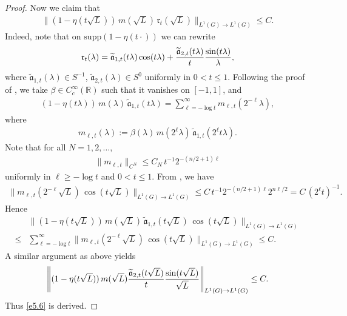 \documentclass[a4paper,12pt]{amsart}
\numberwithin{equation}{section}
\theoremstyle{definition}
\theoremstyle{remark}
\numberwithin{theorem}{section}
\newcommand{\R}{\mathbb{R}}
\newcommand{\supp}{\mathrm{supp}}
\begin{document}
\begin{proof}
Now we claim that
\begin{align}\label{e5.6}
\|(1-\eta(t\sqrt{L}))\,m(\sqrt{L})\,\mathfrak{r}_t(\sqrt{L})\|_{L^1(G)\to L^1(G)}\leq C.
\end{align}
Indeed, note that on $\supp (1-\eta(t\cdot))$ we can rewrite 
\begin{align*}
\mathfrak{r}_t(\lambda)=\widetilde{\mathfrak{a}}_{1,t}(t\lambda)\cos(t\lambda)+{\widetilde{\mathfrak{a}}_{2,t}(t\lambda)\over t}{\sin(t\lambda)\over \lambda},
\end{align*}
where $\widetilde{\mathfrak{a}}_{1,t}(\lambda)\in S^{-1}$, $ \widetilde{\mathfrak{a}}_{2,t}(\lambda)\in S^0$ uniformly in $0<t\leq 1$. Following the proof of \cite[Theorem 8.1]{MuTh}, we take 
$\beta\in C^\infty_c(\R)$ such that it vanishes on $[-1, 1]$, and 
\begin{align*}
(1-\eta(t\lambda))\,m(\lambda)\,\widetilde{\mathfrak{a}}_{1,t}(t\lambda)=\sum_{\ell=-\log t}^\infty m_{\ell,t}(2^{-\ell} \lambda),
\end{align*}
where
\begin{align*}
m_{\ell,t}(\lambda):=\beta(\lambda)\,m(2^\ell\lambda)\,\widetilde{\mathfrak{a}}_{1,t}(2^\ell t\lambda).
\end{align*}
Note that for all $N=1,2,\dots$,
\begin{align*}
\|m_{\ell,t}\|_{C^N} \leq C_N\,t^{-1} 2^{-(n/2+1)\ell}
\end{align*}
uniformly in $\ell\geq-\log t$ and $0<t\leq 1$. From \cite[(8.4)]{MuTh}, we have
\begin{align*}
\|m_{\ell,t}(2^{-\ell}\sqrt{L})\,\cos(t\sqrt{L})\|_{L^1(G)\to L^1(G)}\leq C\,t^{-1} 2^{-(n/2+1)\ell} 2^{n\ell/2}=C\,(2^\ell t)^{-1}.
\end{align*}
Hence
\begin{align*}
{}&\|(1-\eta(t\sqrt{L}))\,m(\sqrt{L})\,\widetilde{\mathfrak{a}}_{1,t}(t\sqrt{L})\,\cos(t\sqrt{L})\|_{L^1(G)\to L^1(G)}\\
\leq{}&\sum_{\ell=-\log t}^\infty \|m_{\ell,t}(2^{-\ell}\sqrt{L})\,\cos(t\sqrt{L})\|_{L^1(G)\to L^1(G)}\leq C.
\end{align*}
A similar argument as above yields 
\begin{align*}
\left\|(1-\eta(t\sqrt{L}))\,m(\sqrt{L}){\widetilde{\mathfrak{a}}_{2,t}(t\sqrt{L})\over t}{\sin(t\sqrt{L})\over \sqrt{L}}\right\|_{L^1(G)\to L^1(G)}\leq C.
\end{align*}
Thus \eqref{e5.6} is derived.


\end{proof}
\end{document}
